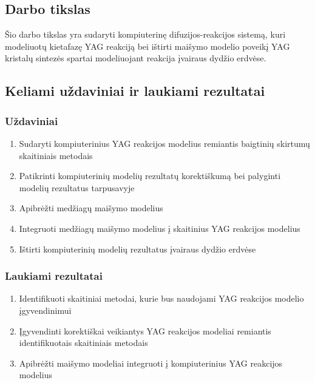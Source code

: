 \documentclass[]{VUMIFTemplateClass}
\begin{document}
\subsection{Darbo tikslas}

Šio darbo tikslas yra sudaryti kompiuterinę difuzijos-reakcijos sistemą, kuri modeliuotų kietafazę YAG reakciją bei ištirti maišymo modelio poveikį YAG kristalų sintezės spartai modeliuojant reakcija įvairaus dydžio erdvėse.

\subsection{Keliami uždaviniai ir laukiami rezultatai}
\subsubsection{Uždaviniai}
\begin{enumerate}
  
    \item Sudaryti kompiuterinius YAG reakcijos modelius remiantis baigtinių skirtumų skaitiniais metodais
    \item Patikrinti kompiuterinių modelių rezultatų korektiškumą bei palyginti modelių rezultatus tarpusavyje
    \item Apibrėžti medžiagų maišymo modelius
    \item Integruoti medžiagų maišymo modelius į skaitinius YAG reakcijos modelius
    \item Ištirti kompiuterinių modelių rezultatus įvairaus dydžio erdvėse
\end{enumerate}
\subsubsection{Laukiami rezultatai}
\begin{enumerate}
    \item Identifikuoti skaitiniai metodai, kurie bus naudojami YAG reakcijos modelio įgyvendinimui

    \item Įgyvendinti korektiškai veikiantys YAG reakcijos modeliai remiantis identifikuotais skaitiniais metodais

    \item Apibrėžti maišymo modeliai integruoti į kompiuterinius YAG reakcijos modelius

\end{enumerate}

\newpage
\end{document}
